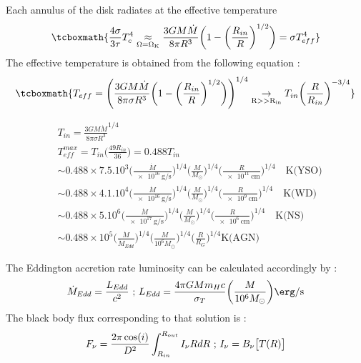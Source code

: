 \documentclass[10pt,a4paper,english]{article}
\begin{document}
Each annulus of the disk radiates at the effective temperature
\begin{equation}
    \tcboxmath{
        \frac{4\sigma}{3\tau}T^4_c\underset{\mathrm{\Omega = \Omega_K}}{\approx}
        \frac{3GM\dot{M}}{8\pi R^3}\bigg(  1-\bigg(\frac{R_{in}}{R}\bigg)^{1/2}\bigg) =
        \sigma T_{eff}^4
    }
\end{equation}
The effective temperature is obtained from the following equation :
\begin{equation}
    \tcboxmath{
        T_{eff} = \Bigg( \frac{3GM\dot{M}}{8\pi \sigma R^3}
        \bigg(  1-\bigg(\frac{R_{in}}{R}\bigg)^{1/2}\bigg)\Bigg)^{1/4}
        \underset{\mathrm{R >>R_{in}}}{\rightarrow} T_{in}\bigg(\frac{R}{R_{in}}\bigg)^{-3/4}
    }
\end{equation}

\begin{align}
    & T_{in} = \frac{3GM\dot{M}}{8\pi\sigma R^3}^{1/4} \\
    & T^{max}_{eff} = T_{in} \bigg(\frac{49 R_{in}}{36}\bigg) = 0.488T_{in} \\
    & \sim 0.488\times7.5.10^3 \bigg( \frac{\dot{M}}{\SI{e16}{\gram \per \s}}\bigg)^{1/4}
    \bigg( \frac{M}{M_{\odot}}\bigg)^{1/4}
    \bigg(  \frac{R}{\SI{e11}{\cm}}\bigg)^{1/4} \quad \text{K(YSO)}     \\
    & \sim 0.488\times 4.1.10^4 \bigg( \frac{\dot{M}}{\SI{e16}{\gram \per \s}}\bigg)^{1/4}
    \bigg( \frac{M}{M_{\odot}}\bigg)^{1/4}
    \bigg(  \frac{R}{\SI{e9}{\cm}}\bigg)^{1/4} \quad \text{K(WD)}     \\
    & \sim 0.488\times 5.10^6  \bigg( \frac{\dot{M}}{\SI{e17}{\gram \per \s}}\bigg)^{1/4}
    \bigg( \frac{M}{M_{\odot}}\bigg)^{1/4}
    \bigg(  \frac{R}{\SI{e6}{\cm}}\bigg)^{1/4} \quad \text{K(NS)}     \\
    &\sim 0.488 \times 10^5 \bigg(  \frac{\dot{M}}{\dot{M}_{Edd}}\bigg)^{1/4}
    \bigg( \frac{M}{10^6 M_{\odot}}\bigg)^{1/4}
    \bigg(  \frac{R}{R_G}\bigg)^{1/4} \text{K(AGN)}
\end{align}

The Eddington accretion rate luminosity can be calculated accordingly by :
\begin{equation}
    \dot{M}_{Edd} = \frac{L_{Edd}}{c^2} \text{ ; } L_{Edd} = \frac{4\pi GMm_Hc}{\sigma_T}
    \bigg( \frac{M}{10^6M_{\odot}}\bigg) \si{\erg \per \s}
\end{equation}
The black body flux corresponding to that solution is :
\begin{equation}
    F_{\nu} = \frac{2\pi \cos (i)}{D^2} \int_{R_{in}}^{R_{out}} I_{\nu}RdR \text{  ;  }
    I_{\nu} = B_{\nu}\big[ T(R)\big] \\
\end{equation}
\end{document}
